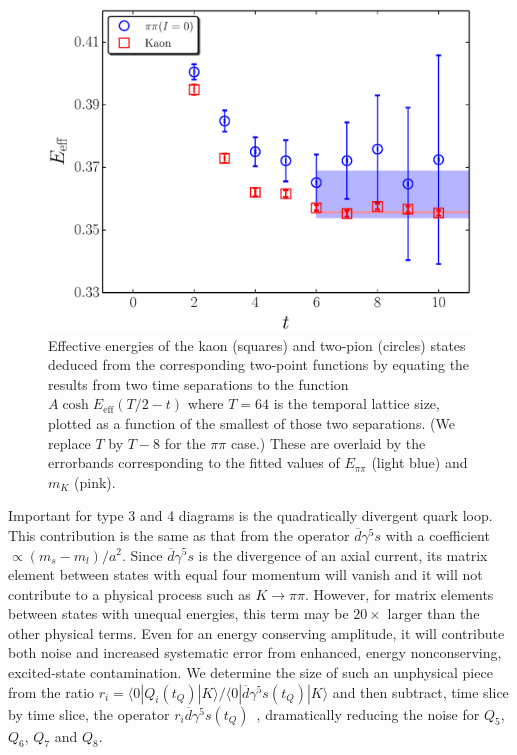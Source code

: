 \documentclass[aps,prl,
superscriptaddress,
showpacs,
preprintnumbers,
bibnotes,
amsmath,
amssymb,
twocolumn,
floatfix,
]{revtex4-1}
\begin{document}
\begin{figure}[htb]
\begin{center}
\includegraphics[width=0.95\linewidth]{figs/pipi_and_kaon_effenergy_2pt.eps}
\end{center} 
\caption{Effective energies of the kaon (squares) and two-pion (circles) states deduced from the corresponding two-point functions by equating the results from two time separations to the function $A\cosh{E_{\mathrm{eff}}(T/2-t)}$ where $T=64$ is the temporal lattice size, plotted as a function of the smallest of those two separations.  (We replace $T$ by $T-8$ for the $\pi\pi$ case.) These are overlaid by the errorbands corresponding to the fitted values of $E_{\pi\pi}$ (light blue) and $m_K$ (pink).} 
\label{fig:E_eff}
\end{figure}

Important for type 3 and 4 diagrams is the quadratically divergent quark loop.  This contribution is the same as that from the operator $\overline{d}\gamma^5 s$ with a coefficient $\propto(m_s-m_l)/a^2$.  Since $\overline{d}\gamma^5 s$ is the divergence of an axial current, its matrix element between states with equal four momentum will vanish and it will not contribute to a physical process such as $K\to\pi\pi$.  However, for matrix elements between states with unequal energies, this term may be $20\times$ larger than the other physical terms.  Even for an energy conserving amplitude, it will contribute both noise and increased systematic error from enhanced, energy nonconserving, excited-state contamination.  We determine the size of such an unphysical piece from the ratio $r_i = \langle 0|Q_i(t_Q)|K\rangle/ \langle 0|\overline{d}\gamma^5 s(t_Q)|K\rangle$ and then subtract, time slice by time slice, the operator $r_i \overline{d}\gamma^5 s(t_Q)$~\cite{Bernard:1985wf}, dramatically reducing the noise for $Q_5$, $Q_6$, $Q_7$ and $Q_8$.
\end{document}
